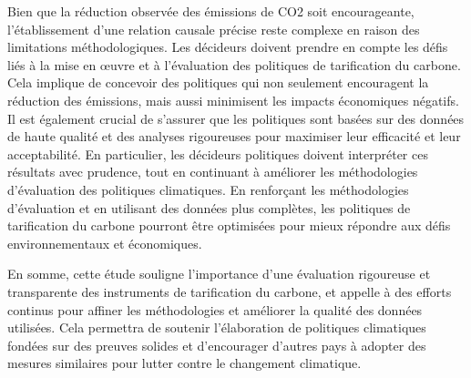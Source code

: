 Bien que la réduction observée des émissions de CO2 soit encourageante, l'établissement d'une relation causale précise reste complexe en raison des limitations méthodologiques. Les décideurs doivent prendre en compte les défis liés à la mise en œuvre et à l'évaluation des politiques de tarification du carbone. Cela implique de concevoir des politiques qui non seulement encouragent la réduction des émissions, mais aussi minimisent les impacts économiques négatifs. Il est également crucial de s'assurer que les politiques sont basées sur des données de haute qualité et des analyses rigoureuses pour maximiser leur efficacité et leur acceptabilité. En particulier, les décideurs politiques doivent interpréter ces résultats avec prudence, tout en continuant à améliorer les méthodologies d'évaluation des politiques climatiques. En renforçant les méthodologies d'évaluation et en utilisant des données plus complètes, les politiques de tarification du carbone pourront être optimisées pour mieux répondre aux défis environnementaux et économiques.

En somme, cette étude souligne l'importance d'une évaluation rigoureuse et transparente des instruments de tarification du carbone, et appelle à des efforts continus pour affiner les méthodologies et améliorer la qualité des données utilisées. Cela permettra de soutenir l'élaboration de politiques climatiques fondées sur des preuves solides et d'encourager d'autres pays à adopter des mesures similaires pour lutter contre le changement climatique.








